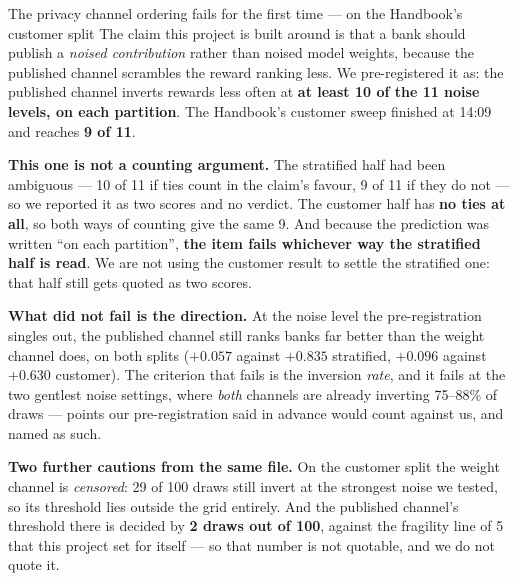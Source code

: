 \documentclass[11pt]{article}
\begin{document}
\begin{warnbox}{The privacy channel ordering fails for the first time --- on the Handbook's customer split}
The claim this project is built around is that a bank should publish a \emph{noised contribution} rather
than noised model weights, because the published channel scrambles the reward ranking less. We
pre-registered it as: the published channel inverts rewards less often at \textbf{at least 10 of the 11
noise levels, on each partition}. The Handbook's customer sweep finished at 14:09 and reaches \textbf{9 of
11}.

\textbf{This one is not a counting argument.} The stratified half had been ambiguous --- 10 of 11 if ties
count in the claim's favour, 9 of 11 if they do not --- so we reported it as two scores and no verdict.
The customer half has \textbf{no ties at all}, so both ways of counting give the same 9. And because the
prediction was written ``on each partition'', \textbf{the item fails whichever way the stratified half is
read}. We are not using the customer result to settle the stratified one: that half still gets quoted as
two scores.

\textbf{What did not fail is the direction.} At the noise level the pre-registration singles out, the
published channel still ranks banks far better than the weight channel does, on both splits ($+0.057$
against $+0.835$ stratified, $+0.096$ against $+0.630$ customer). The criterion that fails is the
inversion \emph{rate}, and it fails at the two gentlest noise settings, where \emph{both} channels are
already inverting 75--88\% of draws --- points our pre-registration said in advance would count against
us, and named as such.

\textbf{Two further cautions from the same file.} On the customer split the weight channel is
\emph{censored}: 29 of 100 draws still invert at the strongest noise we tested, so its threshold lies
outside the grid entirely. And the published channel's threshold there is decided by \textbf{2 draws out
of 100}, against the fragility line of 5 that this project set for itself --- so that number is not
quotable, and we do not quote it.
\end{warnbox}
\end{document}
